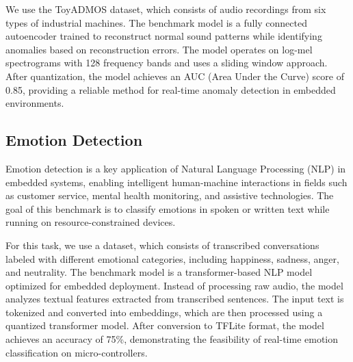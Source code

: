 \documentclass[conference]{IEEEtran}
\begin{document}
We use the ToyADMOS dataset, which consists of audio recordings from six types of industrial machines. The benchmark model is a fully connected autoencoder trained to reconstruct normal sound patterns while identifying anomalies based on reconstruction errors. The model operates on log-mel spectrograms with 128 frequency bands and uses a sliding window approach. After quantization, the model achieves an AUC (Area Under the Curve) score of 0.85, providing a reliable method for real-time anomaly detection in embedded environments.

\subsection{Emotion Detection}

Emotion detection is a key application of Natural Language Processing (NLP) in embedded systems, enabling intelligent human-machine interactions in fields such as customer service, mental health monitoring, and assistive technologies. The goal of this benchmark is to classify emotions in spoken or written text while running on resource-constrained devices.

For this task, we use a dataset, which consists of transcribed conversations labeled with different emotional categories, including happiness, sadness, anger, and neutrality. The benchmark model is a transformer-based NLP model optimized for embedded deployment. Instead of processing raw audio, the model analyzes textual features extracted from transcribed sentences. The input text is tokenized and converted into embeddings, which are then processed using a quantized transformer model. After conversion to TFLite format, the model achieves an accuracy of 75\%, demonstrating the feasibility of real-time emotion classification on micro-controllers.
\end{document}

